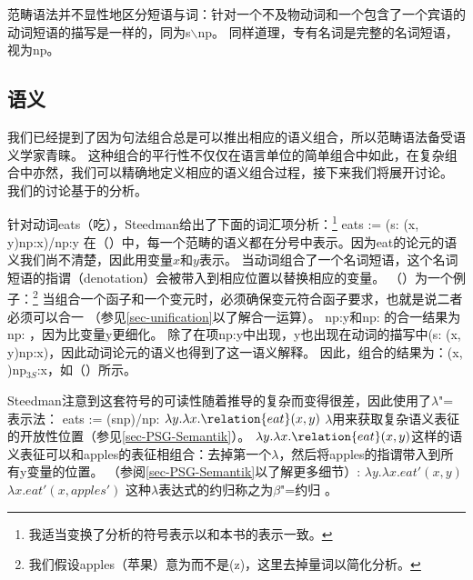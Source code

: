 \noindent
范畴语法并不显性地区分短语与词：针对一个不及物动词和一个包含了一个宾语的动词短语的描写是一样的，同为s$\backslash$np。
同样道理，专有名词是完整的名词短语，视为np。
\isc{$\backslash$}
\is{$\backslash$|)}

\subsection{语义}

我们已经提到了因为句法组合总是可以推出相应的语义组合，所以范畴语法备受语义学家青睐。
这种组合的平行性不仅仅在语言单位的简单组合中如此，在复杂组合中亦然，我们可以精确地定义相应的语义组合过程，接下来我们将展开讨论。
我们的讨论基于\citet[\S~2.1.2]{Steedman97a}的分析。

针对动词eats（吃），Steedman给出了下面的词汇项分析：\footnote{%
 我适当变换了分析的符号表示以和本书的表示一致。
}
\ea
eats := (s: (x, y)\bs np:x)/np:y
\z
在（）中，每一个范畴的语义都在分号中表示。因为eat的论元的语义我们尚不清楚，因此用变量$x$和$y$表示。
当动词组合了一个名词短语，这个名词短语的指谓（denotation）会被带入到相应位置以替换相应的变量。
（）为一个例子：\footnote{%
  我们假设apples（苹果）意为而不是(z)，这里去掉量词以简化分析。
}
\ea
{}
\z
当组合一个函子和一个变元时，必须确保变元符合函子要求，也就是说二者必须可以合一
（参见\ref{sec-unification}以了解合一运算）。
np:y和np: 的合一结果为np: ，因为比变量y更细化。
除了在项np:y中出现，y也出现在动词的描写中(s: (x, y)\bs np:x)，因此动词论元的语义也得到了这一语义解释。
因此，组合的结果为：(x, )\bs np$_{3S}$:x，如（）所示。

Steedman注意到这套符号的可读性随着推导的复杂而变得很差，因此使用了$\lambda$"=表示法：
\ea
eats := (s\bs np)/np: $\lambda y.\lambda x.\relation{eat}(x, y)$
\z
$\lambda$用来获取复杂语义表征的开放性位置（参见\ref{sec-PSG-Semantik}）。
$\lambda y.\lambda x.\relation{eat}(x, y)$这样的语义表征可以和apples的表征相组合：去掉第一个$\lambda$，然后将apples的指谓带入到所有y变量的位置。
（参阅\ref{sec-PSG-Semantik}以了解更多细节）:
\ea
$\lambda y.\lambda x.eat'(x, y)$ \\
$\lambda x.eat'(x, apples')$
\z
这种$\lambda$表达式的约归称之为$\beta$"=约归
\label{Seite-beta-Reduktion}。

